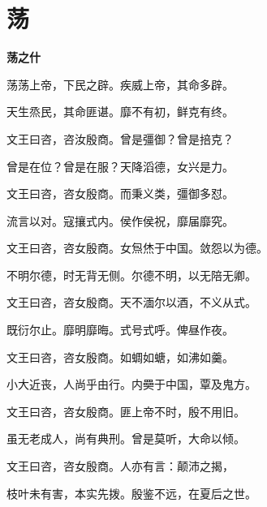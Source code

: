 \documentclass[12pt,a4paper]{ctexbook}
\begin{document}
\section{荡}
\textbf{荡之什}\par\vspace{0.5em}
荡荡上帝，下民之辟。疾威上帝，其命多辟。\par
天生烝民，其命匪谌。靡不有初，鲜克有终。\par
文王曰咨，咨汝殷商。曾是彊御？曾是掊克？\par
曾是在位？曾是在服？天降滔德，女兴是力。\par
文王曰咨，咨女殷商。而秉义类，彊御多怼。\par
流言以对。寇攘式内。侯作侯祝，靡届靡究。\par
文王曰咨，咨女殷商。女炰烋于中国。敛怨以为德。\par
不明尔德，时无背无侧。尔德不明，以无陪无卿。\par
文王曰咨，咨女殷商。天不湎尔以酒，不义从式。\par
既衍尔止。靡明靡晦。式号式呼。俾昼作夜。\par
文王曰咨，咨女殷商。如蜩如螗，如沸如羹。\par
小大近丧，人尚乎由行。内奰于中国，覃及鬼方。\par
文王曰咨，咨女殷商。匪上帝不时，殷不用旧。\par
虽无老成人，尚有典刑。曾是莫听，大命以倾。\par
文王曰咨，咨女殷商。人亦有言：颠沛之揭，\par
枝叶未有害，本实先拨。殷鉴不远，在夏后之世。\par
\end{document}
